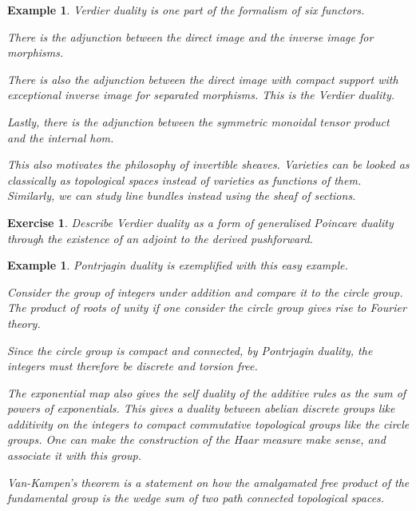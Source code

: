 \documentclass{tufte-book}
\newtheorem{example}[theorem]{Example}
\newtheorem{exercise}[theorem]{Exercise}
\begin{document}
 \begin{example}
 	Verdier duality is one part of the formalism of six functors.
 
 	There is the adjunction between the direct image and the inverse image for morphisms.
 
 	There is also the adjunction between the direct image with compact support with exceptional inverse image for separated morphisms. This is the Verdier duality.
 
 	Lastly, there is the adjunction between the symmetric monoidal tensor product and the internal hom.
 
 	This also motivates the philosophy of invertible sheaves. Varieties can be looked as classically as topological spaces instead of varieties as functions of them. Similarly, we can study line bundles instead using the sheaf of sections.
 \end{example}
 
 \begin{exercise}
 	Describe Verdier duality as a form of generalised Poincare duality through the existence of an adjoint to the derived pushforward.
 \end{exercise}
 
 \begin{example}
 	Pontrjagin duality is exemplified with this easy example.
 
 	Consider the group of integers under addition and compare it to the circle group. The product of roots of unity if one consider the circle group gives rise to Fourier theory.
 
 	Since the circle group is compact and connected, by Pontrjagin duality, the integers must therefore be discrete and torsion free.
 
 	The exponential map also gives the self duality of the additive rules as the sum of powers of exponentials. This gives a duality between abelian discrete groups like additivity on the integers to compact commutative topological groups like the circle groups. One can make the construction of the Haar measure make sense, and associate it with this group.
 
 	Van-Kampen's theorem is a statement on how the amalgamated free product of the fundamental group is the wedge sum of two path connected topological spaces.
 \end{example}
 
\end{document}
